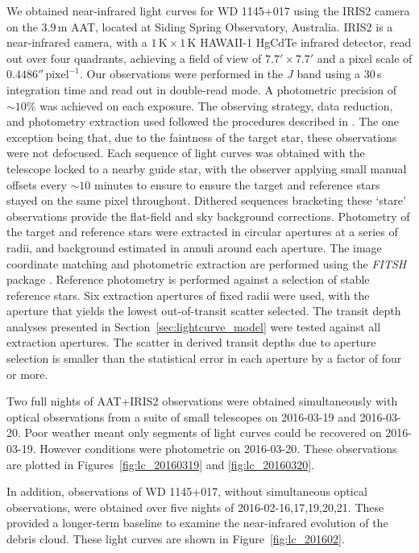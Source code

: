 \documentclass[iop,useAMES,usenatbig]{emulateapj}
\begin{document}
We obtained near-infrared light curves for WD 1145+017 using the IRIS2 camera \citep{2004SPIE.5492..998T} on the 3.9\,m AAT, located at Siding Spring Observatory, Australia. IRIS2 is a near-infrared camera, with a $1\,\mathrm{K} \times 1\,\mathrm{K}$ HAWAII-1 HgCdTe infrared detector, read out over four quadrants, achieving a field of view of $7.7' \times 7.7 '$ and a pixel scale of $0.4486''\,\mathrm{pixel}^{-1}$. Our observations were performed in the $J$ band using a 30\,s integration time and read out in double-read mode. A photometric precision of $\sim 10\mathrm{\%}$ was achieved on each exposure. The observing strategy, data reduction, and photometry extraction used followed the procedures described in \citet{2014MNRAS.445.2746Z,2015MNRAS.454.3002Z}. The one exception being that, due to the faintness of the target star, these observations were not defocused. Each sequence of light curves was obtained with the telescope locked to a nearby guide star, with the observer applying small manual offsets every $\sim 10$ minutes to ensure to ensure the target and reference stars stayed on the same pixel throughout. Dithered sequences bracketing these `stare' observations provide the flat-field and sky background corrections. Photometry of the target and reference stars were extracted in circular apertures at a series of radii, and background estimated in annuli around each aperture. The image coordinate matching and photometric extraction are performed using the \emph{FITSH} package \citep{2012MNRAS.421.1825P}. Reference photometry is performed against a selection of stable reference stars. Six extraction apertures of fixed radii were used, with the aperture that yields the lowest out-of-transit scatter selected. The transit depth analyses presented in Section~\ref{sec:lightcurve_model} were tested against all extraction apertures. The scatter in derived transit depths due to aperture selection is smaller than the statistical error in each aperture by a factor of four or more. 

Two full nights of AAT+IRIS2 observations were obtained simultaneously with optical observations from a suite of small telescopes on 2016-03-19 and 2016-03-20. Poor weather meant only segments of light curves could be recovered on 2016-03-19. However conditions were photometric on 2016-03-20. These observations are plotted in Figures~\ref{fig:lc_20160319} and \ref{fig:lc_20160320}. 

In addition, observations of WD 1145+017, without simultaneous optical observations, were obtained over five nights of 2016-02-16,17,19,20,21. These provided a longer-term baseline to examine the near-infrared evolution of the debris cloud. These light curves are shown in Figure~\ref{fig:lc_201602}.
\end{document}
